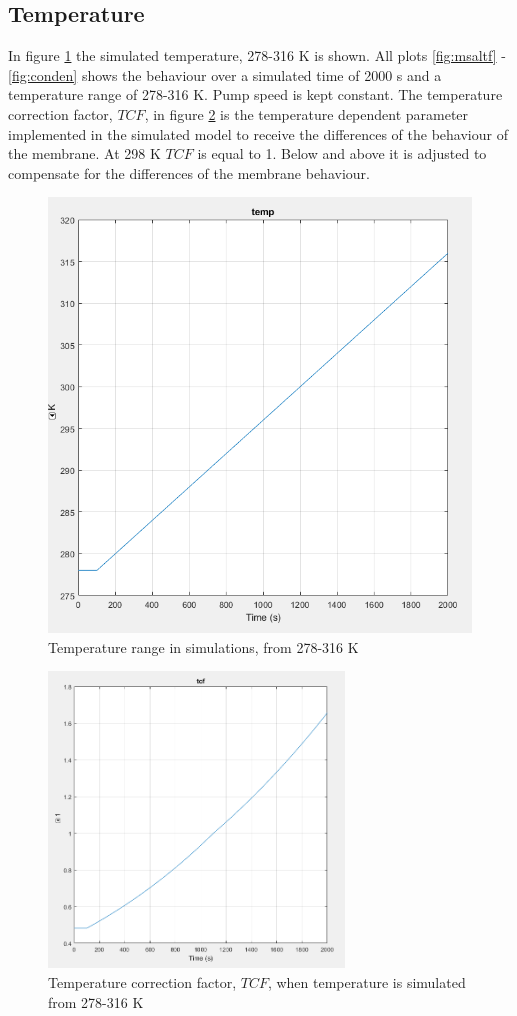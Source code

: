 \subsection{Temperature}
In figure \ref{fig:temp} the simulated temperature, 278-316 K is shown. All plots \ref{fig:msaltf} - \ref{fig:conden} shows the behaviour over a simulated time of 2000 s and a temperature range of 278-316 K. Pump speed is kept constant. The temperature correction factor, $TCF$, in figure \ref{fig:tcf} is the temperature dependent parameter implemented in the simulated model to receive the differences of the behaviour of the membrane. At 298 K $TCF$ is equal to 1. Below and above it is adjusted to compensate for the differences of the membrane behaviour. 
\begin{figure}[h]
  \centering
  \includegraphics[width=0.7\linewidth]{temp.PNG}
  \caption{Temperature range in simulations, from 278-316 K}
  \label{fig:temp}
\end{figure}

\begin{figure}[h]
\centering
    \centering
    \includegraphics[width=0.7\textwidth]{tcf.PNG}
    \caption{Temperature correction factor, $TCF$, when temperature is simulated from 278-316 K}
    \label{fig:tcf}
\end{figure}
\newpage


